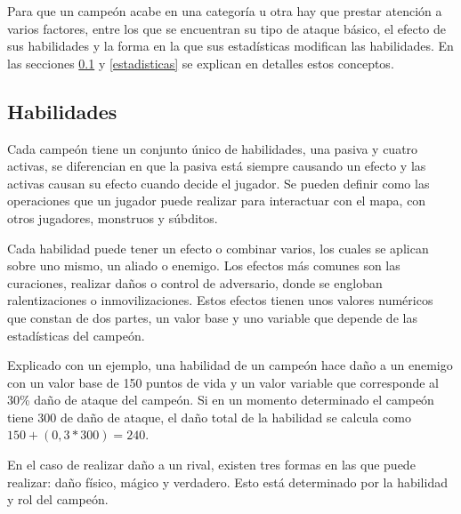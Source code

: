 Para que un campeón acabe en una categoría u otra hay que prestar atención a varios factores, entre los que se encuentran su tipo de ataque básico, el efecto de sus habilidades y la forma en la que sus estadísticas modifican las habilidades. En las secciones \ref{habilidades} y \ref{estadisticas} se explican en detalles estos conceptos.

\subsection{Habilidades}
\label{habilidades}
Cada campeón tiene un conjunto único de habilidades, una pasiva y cuatro activas, se diferencian en que la pasiva está siempre causando un efecto y las activas causan su efecto cuando decide el jugador. Se pueden definir como las operaciones que un jugador puede realizar para interactuar con el mapa, con otros jugadores, monstruos y súbditos.

Cada habilidad puede tener un efecto o combinar varios, los cuales se aplican sobre uno mismo, un aliado o enemigo. Los efectos más comunes son las curaciones, realizar daños o control de adversario, donde se engloban ralentizaciones o inmovilizaciones. Estos efectos tienen unos valores numéricos que constan de dos partes, un valor base y uno variable que depende de las estadísticas del campeón.

Explicado con un ejemplo, una habilidad de un campeón hace daño a un enemigo con un valor base de 150 puntos de vida y un valor variable que corresponde al 30\% daño de ataque del campeón. Si en un momento determinado el campeón tiene 300 de daño de ataque, el daño total de la habilidad se calcula como $150 + (0,3 * 300) = 240$.

En el caso de realizar daño a un rival, existen tres formas en las que puede realizar: daño físico, mágico y verdadero. Esto está determinado por la habilidad y rol del campeón.

